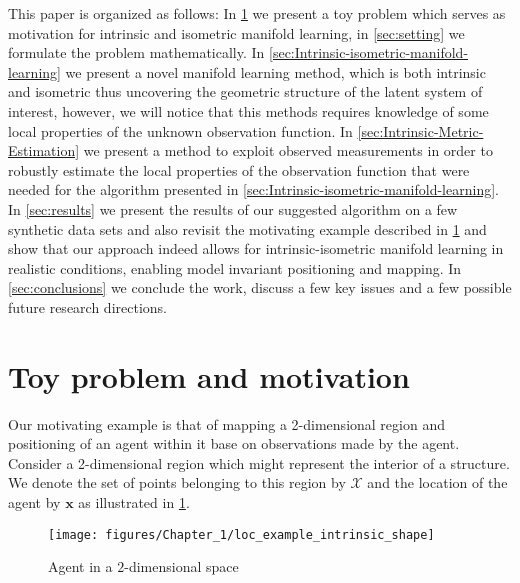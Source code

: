 	This paper is organized as follows: In \cref{sec:motivation} we present a toy problem which serves as motivation for intrinsic and isometric manifold learning, in \cref{sec:setting} we formulate the problem mathematically. In \cref{sec:Intrinsic-isometric-manifold-learning} we present a novel manifold learning method, which is both intrinsic and isometric thus uncovering the geometric structure of the latent system of interest, however, we will notice that this methods requires knowledge of some local properties of the unknown observation function. In \cref{sec:Intrinsic-Metric-Estimation} we present a method to exploit observed measurements in order to robustly estimate the local properties of the observation function that were needed for the algorithm presented in \cref{sec:Intrinsic-isometric-manifold-learning}. In \cref{sec:results} we present the results of our suggested algorithm on a few synthetic data sets and also revisit the motivating example described in \cref{sec:motivation} and show that our approach indeed allows for intrinsic-isometric manifold learning in realistic conditions, enabling model invariant positioning and mapping. In \cref{sec:conclusions} we conclude the work, discuss a few key issues and a few possible future research directions.

\section{Toy problem and motivation}
	\label{sec:motivation}
	
	Our motivating example is that of mapping a 2-dimensional region and positioning of an agent within it base on observations made by the agent. Consider a 2-dimensional region which might represent the interior of a structure. We denote the set of points belonging to this region by $\mathcal{X}$ and the location of the agent by $\mathbf{x}$ as illustrated in \cref{fig:An-agent-in}.
		
	\begin{figure}[h]
		\begin{centering}
			\texttt{[image: figures/Chapter\_1/loc\_example\_intrinsic\_shape]}
			\par\end{centering}
		\caption{Agent in a $2$-dimensional space\label{fig:An-agent-in}}
	\end{figure}
	
